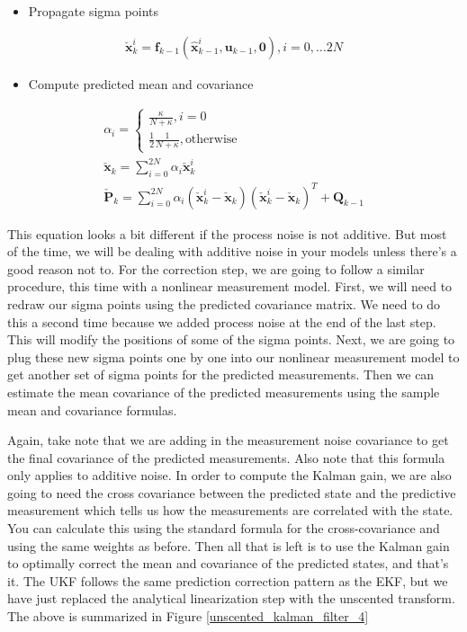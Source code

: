 \begin{itemize}
\item Propagate sigma points
\end{itemize}

\begin{eqnarray}
\check{\mathbf{x}}_{k}^{i} = \mathbf{f}_{k-1}(\hat{\mathbf{x}}_{k-1}^{i}, \mathbf{u}_{k-1}, \mathbf{0}), i =0, \ldots 2N 
\end{eqnarray}

\begin{itemize}
\item  Compute predicted mean and covariance
\end{itemize}

\begin{eqnarray}
\alpha_i = 
\begin{cases}
\frac{\kappa}{N + \kappa}, i = 0 \\
\frac{1}{2}\frac{1}{N + \kappa}, \text{otherwise}
\end{cases} \\
\check{\mathbf{x}}_k = \sum_{i=0}^{2N} \alpha_i \check{\mathbf{x}}_{k}^{i} \\
\check{\mathbf{P}}_k = \sum_{i=0}^{2N} \alpha_i (\check{\mathbf{x}}_{k}^{i} - \check{\mathbf{x}}_{k})(\check{\mathbf{x}}_{k}^{i} - \check{\mathbf{x}}_{k})^T + \mathbf{Q}_{k-1}
\end{eqnarray}

This equation looks a bit different if the process noise is not additive. But most of the time, we will be dealing
with additive noise in your models unless there's a good reason not to. For the correction step,
we are going to follow a similar procedure, this time with a nonlinear measurement model. First, we will need to redraw our sigma
points using the predicted covariance matrix. We need to do this a second time
because we added process noise at the end of the last step. This will modify the positions
of some of the sigma points. Next, we are going to plug these new sigma points one by one into our nonlinear measurement model to get
another set of sigma points for the predicted measurements. Then we can estimate the mean covariance
of the predicted measurements using the sample mean and covariance formulas. 

Again, take note that we are adding in
the measurement noise covariance to get the final covariance of
the predicted measurements. Also note that this formula only applies to additive noise. In order to compute the Kalman gain, we are also
going to need the cross covariance between the predicted state and
the predictive measurement which tells us how the measurements are correlated with the state. You can calculate this using the standard
formula for the cross-covariance and using the same weights as before. Then all that is left is to use the Kalman
gain to optimally correct the mean and covariance of the predicted states,
and that's it. The UKF follows the same prediction correction pattern as the EKF, but we have just replaced the analytical linearization
step with the unscented transform. The above is summarized in Figure \ref{unscented_kalman_filter_4}

